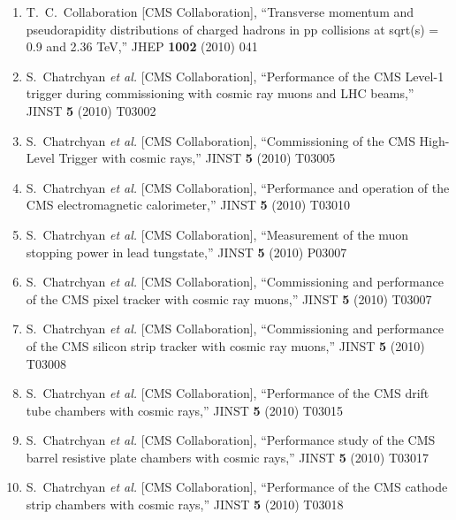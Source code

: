 \documentclass[10pt]{letter}
\begin{document}
\begin{enumerate}
\item T.~C.~Collaboration  [CMS Collaboration],
  ``Transverse momentum and pseudorapidity distributions of charged hadrons in pp collisions at sqrt(s) = 0.9 and 2.36 TeV,''
  JHEP {\bf 1002} (2010) 041
\item S.~Chatrchyan {\it et al.}  [CMS Collaboration],
  ``Performance of the CMS Level-1 trigger during commissioning with cosmic ray muons and LHC beams,''
  JINST {\bf 5} (2010) T03002
\item S.~Chatrchyan {\it et al.}  [CMS Collaboration],
  ``Commissioning of the CMS High-Level Trigger with cosmic rays,''
  JINST {\bf 5} (2010) T03005
\item S.~Chatrchyan {\it et al.}  [CMS Collaboration],
  ``Performance and operation of the CMS electromagnetic calorimeter,''
  JINST {\bf 5} (2010) T03010
\item S.~Chatrchyan {\it et al.}  [CMS Collaboration],
  ``Measurement of the muon stopping power in lead tungstate,''
  JINST {\bf 5} (2010) P03007
\item S.~Chatrchyan {\it et al.}  [CMS Collaboration],
  ``Commissioning and performance of the CMS pixel tracker with cosmic ray muons,''
  JINST {\bf 5} (2010) T03007
\item S.~Chatrchyan {\it et al.}  [CMS Collaboration],
  ``Commissioning and performance of the CMS silicon strip tracker with cosmic ray muons,''
  JINST {\bf 5} (2010) T03008
\item S.~Chatrchyan {\it et al.}  [CMS Collaboration],
  ``Performance of the CMS drift tube chambers with cosmic rays,''
  JINST {\bf 5} (2010) T03015
\item S.~Chatrchyan {\it et al.}  [CMS Collaboration],
  ``Performance study of the CMS barrel resistive plate chambers with cosmic rays,''
  JINST {\bf 5} (2010) T03017
\item S.~Chatrchyan {\it et al.}  [CMS Collaboration],
  ``Performance of the CMS cathode strip chambers with cosmic rays,''
  JINST {\bf 5} (2010) T03018


\end{enumerate}
\end{document}
